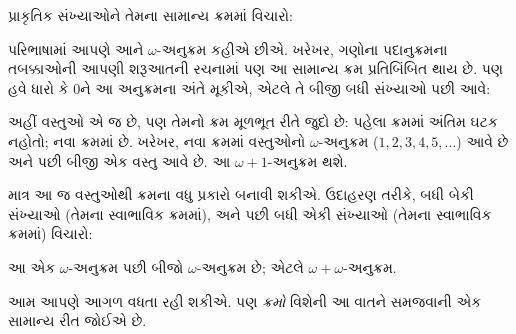 \documentclass[../../../include/open-logic-section]{subfiles}
\begin{document}

પ્રાકૃતિક સંખ્યાઓને તેમના સામાન્ય ક્રમમાં વિચારો:
\begin{center}
\end{center}
પરિભાષામાં આપણે આને $\omega$-અનુક્રમ કહીએ છીએ.
ખરેખર, ગણોના પદાનુક્રમના તબક્કાઓની આપણી શરૂઆતની
રચનામાં પણ આ સામાન્ય ક્રમ પ્રતિબિંબિત થાય છે.
પણ હવે ધારો કે $0$ને આ અનુક્રમના અંતે મૂકીએ,
એટલે તે બીજી બધી સંખ્યાઓ પછી આવે:
\begin{center}
\end{center}
અહીં વસ્તુઓ એ જ છે, પણ તેમનો ક્રમ મૂળભૂત રીતે જુદો
છે: પહેલા ક્રમમાં અંતિમ ઘટક નહોતો; નવા ક્રમમાં છે.
ખરેખર, નવા ક્રમમાં વસ્તુઓનો $\omega$-અનુક્રમ
($1, 2, 3, 4, 5, \ldots$) આવે છે અને પછી બીજી
એક વસ્તુ આવે છે. આ $\omega+1$-અનુક્રમ થશે.

માત્ર આ જ વસ્તુઓથી ક્રમના વધુ પ્રકારો બનાવી શકીએ.
ઉદાહરણ તરીકે, બધી બેકી સંખ્યાઓ (તેમના સ્વાભાવિક
ક્રમમાં), અને પછી બધી એકી સંખ્યાઓ (તેમના સ્વાભાવિક
ક્રમમાં) વિચારો:
\begin{center}
\end{center}
આ એક $\omega$-અનુક્રમ પછી બીજો $\omega$-અનુક્રમ
છે; એટલે $\omega+\omega$-અનુક્રમ.

આમ આપણે આગળ વધતા રહી શકીએ. પણ \emph{ક્રમો}
વિશેની આ વાતને સમજવાની એક સામાન્ય રીત જોઈએ છે.
\end{document}
